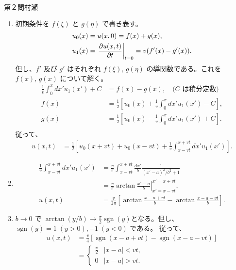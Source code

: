 \begin{answer}{第２問}{村瀬}
\begin{enumerate}
\item
  初期条件を $f(\xi)$ と $g(\eta)$ で書き表す。
  \begin{align*}
    u_0(x) &= u(x,0) = f(x)+g(x),\\
    u_1(x)
      &= \left.\pdiff[u(x,t)]t\right|_{t=0} = v(f'(x)-g'(x)).
  \end{align*}
  但し、$f'$ 及び $g'$ はそれぞれ $f(\xi),\, g(\eta)$ の導関数である。これを$f(x),\,g(x)$ について解く。
  \begin{align*}
    \frac1v\int_0^x dx' u_1(x') + C &= f(x)-g(x),\quad\mbox{($C$ は積分定数)}\\
    f(x) &= \frac12\left[ u_0(x) + \frac1v\int_0^x dx' u_1(x') -C \right],\\
    g(x) &= \frac12\left[ u_0(x) - \frac1v\int_0^x dx' u_1(x') +C \right].\\
  \end{align*}
  従って、
  \begin{align*}
    u(x,t)
      &=\frac12\left[ u_0(x+vt) + u_0(x-vt) + \frac1v\int_{x-vt}^{x+vt} dx' u_1(x')\right].
  \end{align*}

\item
  \begin{align*}
    \frac1v\int_{x-vt}^{x+vt} dx' u_1(x')
      &= \frac{v}\pi\int_{x-vt}^{x+vt} \frac{dx'}b \frac1{(x'-a)^2/b^2 + 1}\\
      &= \frac{v}\pi\left. \arctan \frac{x'-a}b \right|_{x'=x-vt}^{x'=x+vt},\\
    u(x,t) &= \frac{v}{2\pi}\left[ \arctan \frac{x-a+vt}b - \arctan \frac{x-a-vt}b\right].
  \end{align*}

\item
  \def\sgn{\mathop{\mathrm{sgn}}}
  $b\to0$ で $\arctan(y/b)\to\frac\pi2\sgn(y)$となる。但し、$\sgn(y)=1\;(y>0),-1\;(y<0)$ である。
  従って、
  \begin{align*}
    u(x,t)
      &= \frac{v}{4}[ \sgn(x-a+vt) - \sgn(x-a-vt)]\\
      &= \begin{cases}
        \frac v2 & |x-a|<vt,\\
        0 & |x-a|>vt.
      \end{cases}
  \end{align*}

\end{enumerate}
\end{answer}
